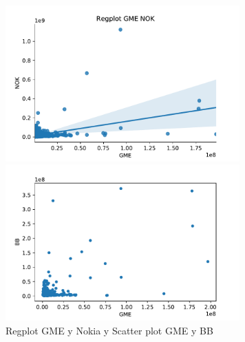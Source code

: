 \documentclass[12pt,twoside]{report}
\begin{document}
\begin{figure}[H]
\begin{multicols}{2}
    \includegraphics[width=9cm]{../code/figures/regplot_GME_NOK.pdf}\par 
    \includegraphics[width=9cm]{../code/figures/GME_BB.pdf}\par 
\end{multicols}
\caption{Regplot GME y Nokia y Scatter plot GME y BB}
\label{fig:regplot-2}
\end{figure}
\end{document}
